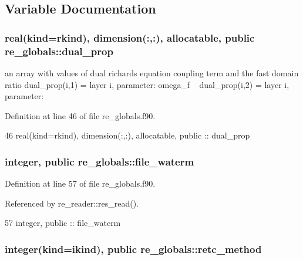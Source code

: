 \subsection{Variable Documentation}
\subsubsection[{dual\+\_\+prop}]{\setlength{\rightskip}{0pt plus 5cm}real(kind=rkind), dimension(\+:,\+:), allocatable, public re\+\_\+globals\+::dual\+\_\+prop}\label{namespacere__globals_a81b64a1b388cc6d0d607c6d4b982388a}


an array with values of dual richards equation coupling term and the fast domain ratio dual\+\_\+prop(i,1) = layer i, parameter\+: omega\+\_\+f ~\newline
 dual\+\_\+prop(i,2) = layer i, parameter\+: 



Definition at line 46 of file re\+\_\+globals.\+f90.


\begin{DoxyCode}
46   \textcolor{keywordtype}{real(kind=rkind)}, \textcolor{keywordtype}{dimension(:,:)}, \textcolor{keywordtype}{allocatable}, \textcolor{keywordtype}{public} :: dual_prop
\end{DoxyCode}
\subsubsection[{file\+\_\+waterm}]{\setlength{\rightskip}{0pt plus 5cm}integer, public re\+\_\+globals\+::file\+\_\+waterm}\label{namespacere__globals_a130d2d25b205b284dba8dc59cf47d6ba}


Definition at line 57 of file re\+\_\+globals.\+f90.



Referenced by re\+\_\+reader\+::res\+\_\+read().


\begin{DoxyCode}
57    \textcolor{keywordtype}{integer}, \textcolor{keywordtype}{public} :: file_waterm
\end{DoxyCode}
\subsubsection[{retc\+\_\+method}]{\setlength{\rightskip}{0pt plus 5cm}integer(kind=ikind), public re\+\_\+globals\+::retc\+\_\+method}\label{namespacere__globals_a8e3cdee0b30d0ad78b779f6f1bc42328}


